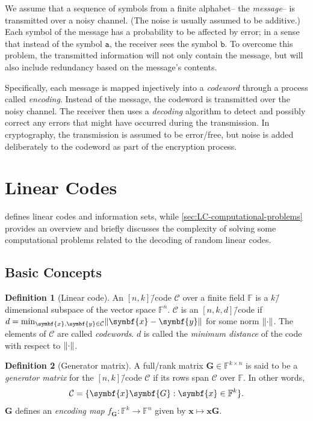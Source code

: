 \documentclass[version=last, paper=A4, parskip=half, oneside]{scrbook}
\theoremstyle{plain}
\theoremstyle{definition}
\newtheorem{definition}{Definition}
\theoremstyle{remark}
\renewcommand*{\vec}{\symbf}
\newcommand*{\mat}{\symbf}
\newcommand*{\FF}{\ensuremath{\mathbb{F}}}
\DeclarePairedDelimiter{\norm}{\lVert}{\rVert}
\begin{document}
We assume that a sequence of symbols from a finite alphabet\--- the
\emph{message}\--- is transmitted over a noisy channel.  (The noise is usually
assumed to be additive.)  Each symbol of the message has a probability to be
affected by error; in a sense that instead of the symbol \(\mathtt{a}\), the
receiver sees the symbol \(\mathtt{b}\).  To overcome this problem, the
transmitted information will not only contain the message, but will also include
redundancy based on the message's contents.

Specifically, each message is mapped injectively into a \emph{codeword} through
a process called \emph{encoding}.  Instead of the message, the codeword is
transmitted over the noisy channel.  The receiver then uses a \emph{decoding}
algorithm to detect and possibly correct any errors that might have occurred
during the transmission.  In cryptography, the transmission is assumed to be
error\-/free, but noise is added deliberately to the codeword as part of the
encryption process.

\section{Linear Codes}

 defines linear codes and information sets, while
\cref{sec:LC-computational-problems} provides an overview and briefly discusses
the complexity of solving some computational problems related to the decoding of
random linear codes.

\subsection{Basic Concepts}\label{sec:LC-basic-concepts}

\begin{definition}[Linear code]
  An \([n, k]\)\=/code \(\mathcal{C}\) over a finite field \(\FF\) is a
  \(k\)\=/dimensional subspace of the vector space \(\FF^n\).  \(\mathcal{C}\)
  is an \([n, k, d]\)\=/code if
  \(d = \min_{\vec{x}, \vec{y} \in \mathcal{C}} \norm{\vec{x} - \vec{y}}\) for
  some norm \(\norm{\cdot}\).  The elements of \(\mathcal{C}\) are called
  \emph{codewords}.  \(d\) is called the \emph{minimum distance} of the code
  with respect to \(\norm{\cdot}\).
\end{definition}

\begin{definition}[Generator matrix]
  A full\-/rank matrix \(\mat{G} \in \FF^{k \times n}\) is said to be a
  \emph{generator matrix} for the \([n, k]\)\=/code \(\mathcal{C}\) if its rows
  span \(\mathcal{C}\) over \(\FF\).  In other words,
  \[
    \mathcal{C} = \{\vec{x} \mat{G} : \vec{x} \in \FF^k\}\text.
  \]
  \(\mat{G}\) defines an \emph{encoding map}
  \(f_{\mat{G}}\colon \FF^k \to \FF^n\) given by
  \(\vec{x} \mapsto \vec{x} \vec{G}\).
\end{definition}
\end{document}
